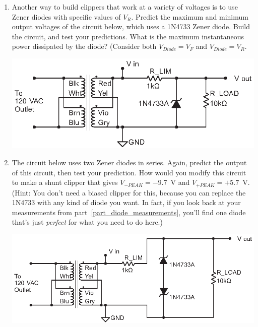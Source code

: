 \begin{enumerate}[wide]
\item Another way to build clippers that work at a variety of voltages is to use Zener diodes with specific values of $V_R$.  Predict the maximum and minimum output voltages of the circuit below, which uses a 1N4733 Zener diode.  Build the circuit, and test your predictions.  What is the maximum instantaneous power dissipated by the diode?  (Consider both $V_{Diode}=V_F$ and $V_{Diode}=V_R$.  \label{part_zener_shunt_clipper}
\begin{center}
\includegraphics{diodes/zener_shunt_clipper.eps}
\end{center} 
 
\item The circuit below uses two Zener diodes in series.  Again, predict the output of this circuit, then test your prediction.  How would you modify this circuit to make a shunt clipper that gives $V_{-PEAK} = -9.7$~V and $V_{+PEAK} = +5.7$~V.   (Hint: You don't need a biased clipper for this, because you can replace the 1N4733 with any kind of diode you want.  In fact, if you look back at your measurements from part~\ref{part_diode_measurements}, you'll find one diode that's just \textit{perfect} for what you need to do here.)  
\begin{center}
\includegraphics{diodes/double_zener_shunt_clipper.eps}
\end{center} 
 
\end{enumerate}



